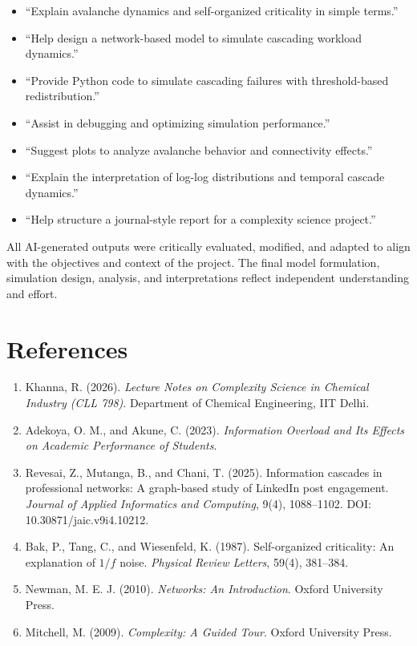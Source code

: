 \documentclass[12pt]{article}
\begin{document}
\begin{itemize}
\item “Explain avalanche dynamics and self-organized criticality in simple terms.”

\item “Help design a network-based model to simulate cascading workload dynamics.”

\item “Provide Python code to simulate cascading failures with threshold-based redistribution.”

\item “Assist in debugging and optimizing simulation performance.”

\item “Suggest plots to analyze avalanche behavior and connectivity effects.”

\item “Explain the interpretation of log-log distributions and temporal cascade dynamics.”

\item “Help structure a journal-style report for a complexity science project.”

\end{itemize}

All AI-generated outputs were critically evaluated, modified, and adapted to align with the objectives and context of the project. The final model formulation, simulation design, analysis, and interpretations reflect independent understanding and effort.

\section{References}
\begin{enumerate}
\item Khanna, R. (2026). \textit{Lecture Notes on Complexity Science in Chemical Industry (CLL 798)}. Department of Chemical Engineering, IIT Delhi.
\item Adekoya, O. M., and Akune, C. (2023). \textit{Information Overload and Its Effects on Academic Performance of Students}.

\item Revesai, Z., Mutanga, B., and Chani, T. (2025). Information cascades in professional networks: A graph-based study of LinkedIn post engagement. \textit{Journal of Applied Informatics and Computing}, 9(4), 1088–1102. DOI: 10.30871/jaic.v9i4.10212.

\item Bak, P., Tang, C., and Wiesenfeld, K. (1987). Self-organized criticality: An explanation of $1/f$ noise. \textit{Physical Review Letters}, 59(4), 381–384.

\item Newman, M. E. J. (2010). \textit{Networks: An Introduction}. Oxford University Press.

\item Mitchell, M. (2009). \textit{Complexity: A Guided Tour}. Oxford University Press.


\end{enumerate}
\end{document}
